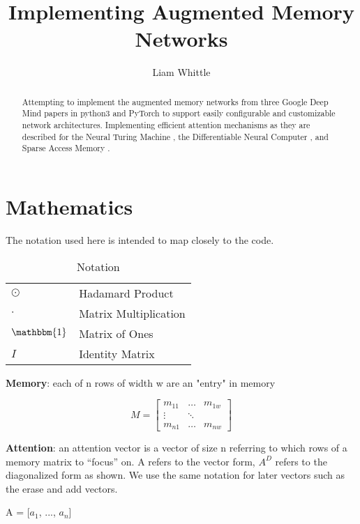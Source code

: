 \documentclass[a4paper]{article}
\title{Implementing Augmented Memory Networks}
\author{Liam Whittle}
\begin{document}
	
\maketitle

\begin{abstract}
	Attempting to implement the augmented memory networks from three Google Deep Mind papers in python3 and PyTorch to support easily configurable and customizable network architectures. Implementing efficient attention mechanisms as they are described for the Neural Turing Machine \cite{graves2014neural}, the Differentiable Neural Computer \cite{graves2016hybrid}, and Sparse Access Memory \cite{rae2016scaling}.
\end{abstract}

\section{Mathematics}

The notation used here is intended to map closely to the code. 

\begin{table}
\caption{Notation}
\begin{tabularx}{\textwidth}{@{}XX@{}}
\toprule
  $\odot$ & Hadamard Product \\
  $\cdot$  & Matrix Multiplication \\
  $\mathbbm{1}$  & Matrix of Ones\\
  $I$  & Identity Matrix\\
\bottomrule
\end{tabularx}
\end{table}

\textbf{Memory}: each of n rows of width w are an "entry" in memory

\[ M = \begin{bmatrix} 

    m_{11} 	& 	\dots 		& 	m_{1w} 	\\
    \vdots   	&   	\ddots 		&       	\\
    m_{n1} 	&       \dots  		&   	m_{nw} 

\end{bmatrix}
\]

\textbf{Attention}: an attention vector is a vector of size n referring to which rows of a memory matrix to ``focus'' on. A refers to the vector form, $A^D$ refers to the diagonalized form as shown. We use the same notation for later vectors such as the erase and add vectors.

A = [$a_1$, ..., $a_n$] 
\end{document}
